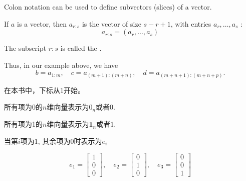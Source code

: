 \begin{definition}[Subvectors]
    Colon notation can be used to define subvectors (slices) of a vector.

    If $ a $ is a vector, then $ a_{r: s} $ is the vector of size $ s-r+1 $, with entries $ a_{r}, \ldots, a_{s} $ :
    \begin{equation}
    a_{r: s}=\left(a_{r}, \ldots, a_{s}\right)
    \end{equation}

    The subscript $ r:s $ is called the . 
\end{definition}

Thus, in our example above, we have
    \begin{equation}
    b=a_{1: m}, \quad c=a_{(m+1):(m+n)}, \quad d=a_{(m+n+1):(m+n+p)} .
    \end{equation}

\begin{remark}
    在本书中，下标从1开始。
\end{remark}

\begin{definition}[零向量]
    所有项为$0$的$n$维向量表示为$0_n$或者$0$.
\end{definition}

\begin{definition}[全一向量]
      所有项为1的$n$维向量表示为$\boldsymbol{1}_n$或者$1$.
\end{definition}

\begin{definition}[单位向量]
    当第$i$项为$1$, 其余项为$0$时表示为$e_i$
\end{definition}

\begin{example}
    \begin{equation} {e}_{1}=\left[\begin{array}{l}1 \\ 0 \\ 0\end{array}\right], \quad e_{2}=\left[\begin{array}{l}0 \\ 1 \\ 0\end{array}\right], \quad e_{3}=\left[\begin{array}{l}0 \\ 0 \\ 1\end{array}\right] \end{equation}
\end{example}

